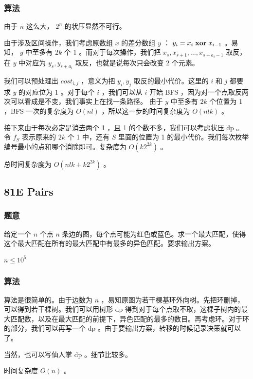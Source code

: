 \documentclass[11pt]{article}
\begin{document}
\subsubsection{算法}
\label{sec-6-1-2}

    由于 $n$ 这么大， $2^n$ 的状压显然不可行。

    由于涉及区间操作，我们考虑原数组 $x$ 的差分数组 $y$ ： $y_i = x_i \hspace{0.1cm} \textbf{xor} \hspace{0.1cm} x_{i - 1}$ 。易知， $y$ 中至多有 $2k$ 个 1 。而对于每次操作，我们把 $x_s, x_{s + 1}, \dots, x_{s + a_i - 1}$ 取反，在 $y$ 中对应为 $y_s, y_{s + a_i}$ 取反，也就是说每次只会改变 2 个元素。

    我们可以预处理出 $cost_{i, j}$ ，意义为把 $y_i, y_j$ 取反的最小代价。这里的 $i$ 和 $j$ 都要求 $y$ 的对应位为 1 。对于每个 $i$ ，我们可以从 $i$ 开始 BFS ，因为对一个点取反两次可以看成是不变，我们事实上在找一条路径。 由于 $y$ 中至多有 $2k$ 个位置为 1 ，BFS 一次的复杂度为 $O(nl)$ ，所以这一步的时间复杂度为 $O(nlk)$ 。

    接下来由于每次必定是消去两个 1 ，且 1 的个数不多，我们可以考虑状压 dp 。令 $f_{S}$ 表示原来的 $2k$ 个 1 中，还有 $S$ 里面的位置为 1 的最小代价。我们每次枚举编号最小的点和哪个消除即可。复杂度为 $O(k 2^{2k})$ 。

    总时间复杂度为 $O(nlk + k 2^{2k})$ 。
\subsection{81E   Pairs}
\label{sec-6-2}
\subsubsection{题意}
\label{sec-6-2-1}

    给定一个 $n$ 个点 $n$ 条边的图，每个点可能为红色或蓝色。求一个最大匹配，使得这个最大匹配在所有的最大匹配中有最多的异色匹配。要求输出方案。

    $n \leq 10^5$
\subsubsection{算法}
\label{sec-6-2-2}

    算法是很简单的。由于边数为 $n$ ，易知原图为若干棵基环外向树。先把环删掉，可以得到若干棵树。我们可以用树形 dp 得到对于每个点取不取，这棵子树内的最大匹配数，以及在最大匹配的前提下，异色匹配的最多的数目。再考虑环。对于环的部分，我们可以再写一个 dp 。由于要输出方案，转移的时候记录决策就可以了。

    当然，也可以写仙人掌 dp 。细节比较多。

    时间复杂度 $O(n)$ 。
\end{document}
